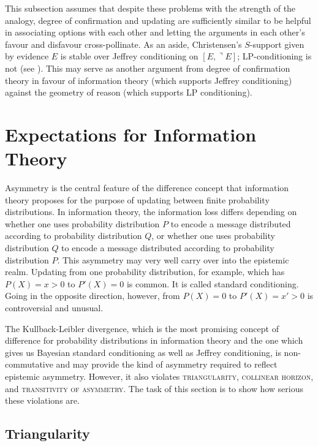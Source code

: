 \documentclass[phd,12pt,oneside]{ubcthesis}
\begin{document}
This subsection assumes that despite these problems with the strength
of the analogy, degree of confirmation and updating are sufficiently
similar to be helpful in associating options with each other and
letting the arguments in each other's favour and disfavour
cross-pollinate. As an aside, Christensen's $S$-support given by
evidence $E$ is stable over Jeffrey conditioning on
$[E,\urcorner{}E]$; LP-conditioning is not (see
). This may serve as another argument
from degree of confirmation theory in favour of information theory
(which supports Jeffrey conditioning) against the geometry of reason
(which supports LP conditioning).

\section{Expectations for Information Theory}
\label{sec:expinfth}

Asymmetry is the central feature of the difference concept that
information theory proposes for the purpose of updating between finite
probability distributions. In information theory, the information loss
differs depending on whether one uses probability distribution $P$ to
encode a message distributed according to probability distribution
$Q$, or whether one uses probability distribution $Q$ to encode a
message distributed according to probability distribution $P$. This
asymmetry may very well carry over into the epistemic realm. Updating
from one probability distribution, for example, which has $P(X)=x>0$
to $P'(X)=0$ is common. It is called standard conditioning. Going in
the opposite direction, however, from $P(X)=0$ to $P'(X)=x'>0$ is
controversial and unusual.

The Kullback-Leibler divergence, which is the most promising concept
of difference for probability distributions in information theory and
the one which gives us Bayesian standard conditioning as well as
Jeffrey conditioning, is non-commutative and may provide the kind of
asymmetry required to reflect epistemic asymmetry. However, it also
violates \textsc{triangularity}, \textsc{collinear horizon}, and
\textsc{transitivity of asymmetry}. The task of this section is to
show how serious these violations are.


\subsection{Triangularity}
\label{subsec:triangularity}
\end{document}

